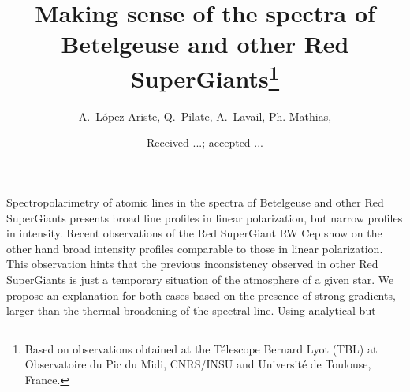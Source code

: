 \documentclass{/Users/art2/TeX/aanda/aa}
\begin{document}
 


   \title{Making sense of the spectra of Betelgeuse and other Red SuperGiants\thanks{Based on observations obtained at the T\'elescope Bernard Lyot
(TBL) at Observatoire du Pic du Midi, CNRS/INSU and Universit\'e de
Toulouse, France.}}

   \author{{ A.~L{\'o}pez Ariste}, { Q.~Pilate},{ A.~Lavail},{ Ph. Mathias},  }
   \date{Received ...; accepted ...}

   

 
  \abstract
  
  {Spectropolarimetry of atomic lines in the spectra of Betelgeuse and other Red SuperGiants presents broad  line profiles in 
  linear polarization, but narrow profiles in intensity. Recent observations of the Red SuperGiant RW Cep show on the other 
  hand broad intensity profiles comparable to those in linear polarization. This observation hints that the previous inconsistency 
  observed in other Red SuperGiants is just a temporary situation of the atmosphere of a given star. We propose an explanation 
  for both cases based on the presence of strong gradients, larger than the thermal broadening of the spectral line. Using 
  analytical but }
   {}
   {}
   { }
   {}
  
   \keywords{}


   \maketitle
%
\end{document}
